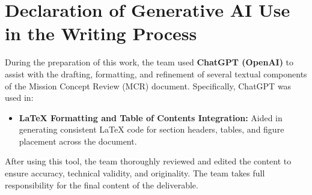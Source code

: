 \section*{Declaration of Generative AI Use in the Writing Process}

During the preparation of this work, the team used \textbf{ChatGPT (OpenAI)} to assist with the drafting, formatting, and refinement of several textual components of the Mission Concept Review (MCR) document. Specifically, ChatGPT was used in:

\begin{itemize}
    \item \textbf{LaTeX Formatting and Table of Contents Integration:} Aided in generating consistent LaTeX code for section headers, tables, and figure placement across the document.
\end{itemize}

After using this tool, the team thoroughly reviewed and edited the content to ensure accuracy, technical validity, and originality. The team takes full responsibility for the final content of the deliverable.



